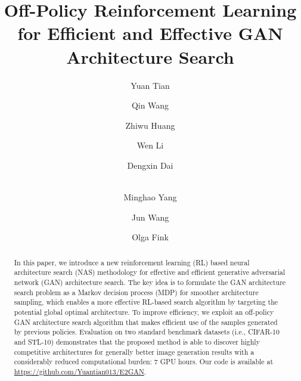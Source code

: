 \documentclass[runningheads]{llncs}
\begin{document}
\pagestyle{headings}
\mainmatter
\def\ECCVSubNumber{173}  

\title{Off-Policy Reinforcement Learning for Efficient and Effective GAN Architecture Search} 


\author{Yuan Tian  \and
Qin Wang  \and
Zhiwu Huang \and
Wen Li \and
Dengxin Dai \and\\
Minghao Yang  \and
Jun Wang \and
Olga Fink 
}

{\let\thefootnote\relax{}}
\maketitle
\begin{abstract}
In this paper, we introduce a new reinforcement learning (RL) based neural architecture search (NAS) methodology for effective and efficient generative adversarial network (GAN) architecture search. The key idea is to formulate the GAN architecture search problem as a Markov decision process (MDP) for smoother architecture sampling, which enables a more effective RL-based search algorithm by targeting the potential global optimal architecture. To improve efficiency, we exploit an off-policy GAN architecture search algorithm that makes efficient use of the samples generated by previous policies.
Evaluation on two standard benchmark datasets (i.e., CIFAR-10 and STL-10) demonstrates that the proposed method is able to discover highly competitive architectures for generally better image generation results with a  considerably reduced computational burden: 7 GPU hours. Our code is available at \href{https://github.com/Yuantian013/E2GAN}{https://github.com/Yuantian013/E2GAN}.
\end{abstract}
\end{document}
